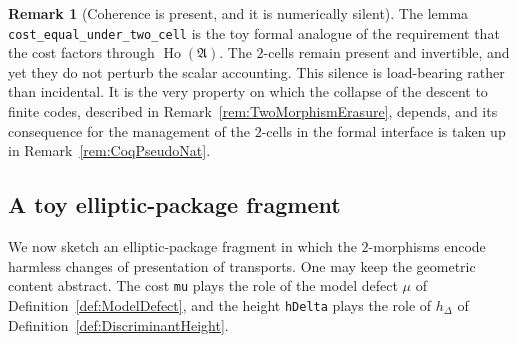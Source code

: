 \documentclass[10pt, reqno]{amsart}
\theoremstyle{plain}
\theoremstyle{definition}
\newtheorem{remark}[theorem]{Remark}
\theoremstyle{plain}
\newcommand{\Ho}{\operatorname{Ho}}
\begin{document}
\begin{remark}[Coherence is present, and it is numerically silent]\label{rem:CoqCoherenceSilent}
The lemma \texttt{cost\_equal\_under\_two\_cell} is the toy formal analogue of the requirement that the cost factors through $\Ho(\mathfrak{A})$. The $2$-cells remain present and invertible, and yet they do not perturb the scalar accounting. This silence is load-bearing rather than incidental. It is the very property on which the collapse of the descent to finite codes, described in Remark~\ref{rem:TwoMorphismErasure}, depends, and its consequence for the management of the $2$-cells in the formal interface is taken up in Remark~\ref{rem:CoqPseudoNat}.
\end{remark}

\subsection{A toy elliptic-package fragment}\label{subsec:CoqEllPkg}

We now sketch an elliptic-package fragment in which the $2$-morphisms encode harmless changes of presentation of transports. One may keep the geometric content abstract. The cost \texttt{mu} plays the role of the model defect $\mu$ of Definition~\ref{def:ModelDefect}, and the height \texttt{hDelta} plays the role of $h_\Delta$ of Definition~\ref{def:DiscriminantHeight}.
\end{document}
